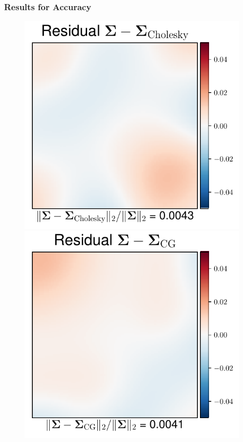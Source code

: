 \documentclass[aspectratio=169]{beamer}
\begin{document}
\begin{frame}
\frametitle{Results for Accuracy}
\begin{figure}
    \centering
    \mbox{{\includegraphics[scale=0.4]{src/images/simu1_ex1_A_Chol.pdf}}}
    \mbox{{\includegraphics[scale=0.4]{src/images/simu1_ex1_A_CG.pdf}}}

\end{figure}
\end{frame}
\end{document}
